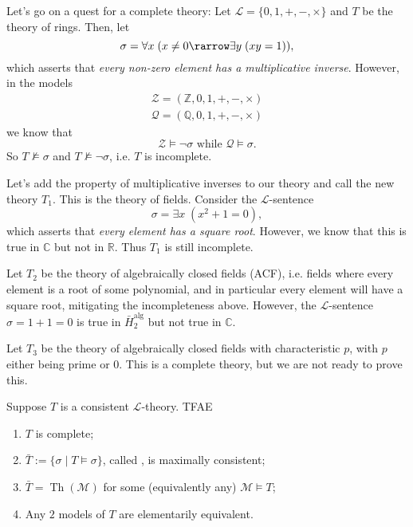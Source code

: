 \documentclass[notoc,notitlepage]{tufte-book}
\DeclareMathOperator{\Th}{Th }
\DeclareMathOperator{\alg}{alg}
\begin{document}
\begin{eg}
  Let's go on a quest for a complete theory: Let $\mathcal{L} = \{ 0, 1, +, -, \times \}$ and $T$ be the theory of rings. Then, let
  \begin{equation*}
    \sigma = \forall x \; ( x \neq 0 \rarrow \exists y \; ( xy = 1 ) ),
  \end{equation*}
  which asserts that \textit{every non-zero element has a multiplicative inverse}. However, in the models
  \begin{gather*}
    \mathcal{Z} = (\mathbb{Z}, 0, 1, +, -, \times) \\
    \mathcal{Q} = (\mathbb{Q}, 0, 1, +, -, \times)
  \end{gather*}
  we know that
  \begin{equation*}
    \mathcal{Z} \models \neg \sigma \text{ while } \mathcal{Q} \models \sigma.
  \end{equation*}
  So $T \not\models \sigma$ and $T \not\models \neg \sigma$, i.e. $T$ is incomplete.

  Let's add the property of multiplicative inverses to our theory and call the new theory $T_1$. This is the theory of fields. Consider the $\mathcal{L}$-sentence
  \begin{equation*}
    \sigma = \exists x \; (x^2 + 1 = 0),
  \end{equation*}
  which asserts that \textit{every element has a square root}. However, we know that this is true in $\mathbb{C}$ but not in $\mathbb{R}$. Thus $T_1$ is still incomplete.

  Let $T_2$ be the theory of algebraically closed fields (ACF), i.e. fields where every element is a root of some polynomial, and in particular every element will have a square root, mitigating the incompleteness above. However, the $\mathcal{L}$-sentence $\sigma = 1 + 1 = 0$ is true in $\bar{H}_2^{\alg}$ but not true in $\mathbb{C}$.

  Let $T_3$ be the theory of algebraically closed fields with characteristic $p$, with $p$ either being prime or $0$. This is a complete theory, but we are not ready to prove this.
\end{eg}

\begin{lemma}\label{lemma:equivalence_to_a_complete_theory}
  Suppose $T$ is a consistent $\mathcal{L}$-theory. TFAE
  \begin{enumerate}
    \item $T$ is complete;
    \item $\bar{T} := \{ \sigma \mid T \models \sigma \}$, called , is maximally consistent;
    \item $\bar{T} = \Th(\mathcal{M})$ for some (equivalently any) $\mathcal{M} \models T$;
    \item Any $2$ models of $T$ are elementarily equivalent.
  \end{enumerate}
\end{lemma}
\end{document}
